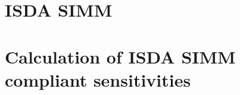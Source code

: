\documentclass[../Thesis_AHoecherl.tex]{subfiles}
\begin{document}
    \section{ISDA SIMM}

    \section{Calculation of ISDA SIMM compliant sensitivities}
\end{document}
